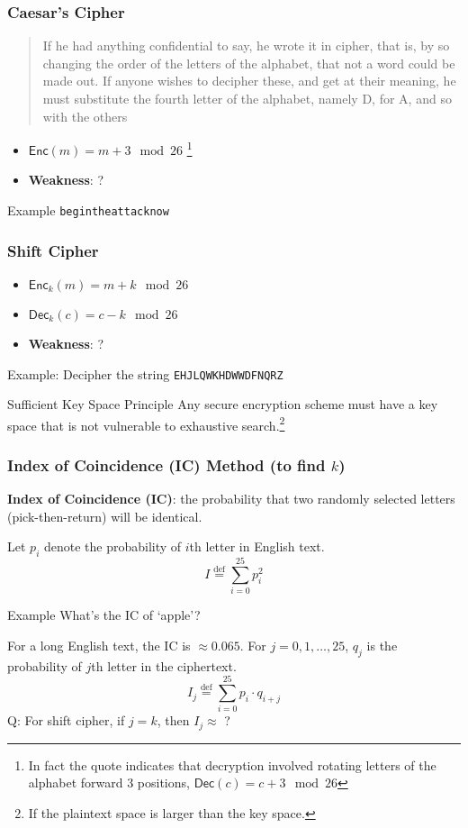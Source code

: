 \begin{frame}[fragile]\frametitle{Caesar's Cipher}
\begin{quote}
If he had anything confidential to say, he wrote it in cipher, that is, by so changing the order of the letters of the alphabet, that not a word could be made out. If anyone wishes to \alert{decipher} these, and get at their meaning, he must \alert{substitute the fourth letter of the alphabet, namely D, for A}, and so with the others

\end{quote}
\begin{itemize}
	\item $\mathsf{Enc}(m)=m+3\mod 26$ \footnote{In fact the quote indicates that decryption involved rotating letters of the alphabet forward 3 positions, $\mathsf{Dec}(c)=c+3\mod 26$}
	\item \textbf{Weakness}: ? %
\end{itemize}
\begin{exampleblock}{Example}
\verb|begintheattacknow|
\end{exampleblock}
\end{frame}
\begin{frame}[fragile]\frametitle{Shift Cipher}
\begin{itemize}
\item $\mathsf{Enc}_k(m)=m+k\mod 26$
\item $\mathsf{Dec}_k(c)=c-k\mod 26$
\item \textbf{Weakness}: ? %
\end{itemize}
\begin{exampleblock}{Example: Decipher the string}	
\verb|EHJLQWKHDWWDFNQRZ|
\end{exampleblock}
\begin{alertblock}{Sufficient Key Space Principle}
Any secure encryption scheme must have a key space that is not vulnerable to exhaustive search.\footnote{If the plaintext space is larger than the key space.}
\end{alertblock}
\end{frame}
\begin{frame}\frametitle{Index of Coincidence (IC) Method (to find $k$)}
\textbf{Index of Coincidence (IC)}: the probability that two randomly selected letters (pick-then-return) will be identical.

Let $p_i$ denote the probability of $i$th letter in English text.
\[I \overset{\text{def}}{=}\sum_{i=0}^{25} p_i^2 \]
\begin{exampleblock}{Example}
What's the IC of `apple'?
\end{exampleblock}

For a long English text, the IC is $\approx 0.065$.
For $j = 0, 1, \dotsc , 25$, $q_j$ is the probability of $j$th letter in the ciphertext.
\[I_j \overset{\text{def}}{=}\sum_{i=0}^{25} p_i \cdot q_{i+j}\]
\alert{Q: For shift cipher, if $j = k$, then $I_j \approx$ ?}
\end{frame}

